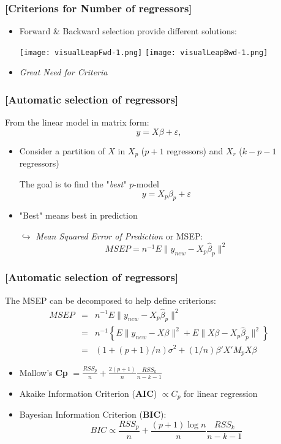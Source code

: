 \documentclass[xcolor=x11names,compress, handhouts]{beamer}
\renewcommand{\(}{\begin{columns}}
\renewcommand{\)}{\end{columns}}
\newcommand{\<}[1]{\begin{column}{#1}}
\renewcommand{\>}{\end{column}}
\begin{document}
\begin{frame} %
\frametitle{\textcolor{brique}{[Criterions for  Number of regressors]}}

\pause
\begin{itemize}[<+->]
  \item Forward \& Backward selection provide different solutions:
  \item[] \texttt{[image: visualLeapFwd-1.png]} \texttt{[image: visualLeapBwd-1.png]}
  \item \begin{center} \emph{Great Need for Criteria} \end{center}
\end{itemize}
\end{frame}


\begin{frame} %
\frametitle{\textcolor{brique}{[Automatic selection of regressors]}}
From the linear model in matrix form:
$$
 y = X \beta + \varepsilon,
$$
\pause
\begin{itemize}[<+->]
  \item Consider  a partition of $X$ in $X_p$ ($p+1$ regressors) and $X_r$ ($k-p-1$ regressors)
  \item[] The goal is to find the "\textit{best}" $p$-model
      $$
      y = X_p \beta_p + \varepsilon
      $$
  \item "Best" means  best in prediction
  \item[$\hookrightarrow$] \emph{Mean Squared Error of Prediction} or MSEP:
  $$
    MSEP = n^{-1} E \| y_{new} - X_p\widehat{\beta}_p\|^2
  $$
\end{itemize}
\end{frame}


\begin{frame} %
\frametitle{\textcolor{brique}{[Automatic selection of regressors]}}

The MSEP can be decomposed to help define criterions:
\begin{eqnarray*}
MSEP &=& n^{-1} E \| y_{new} - X_p\widehat{\beta}_p\|^2   \\
    &=& n^{-1} \left\{ E \| y_{new} - X{\beta}\|^2 + E \| X{\beta} - X_p\widehat{\beta}_p\|^2  \right\}\\
    &=& (1+(p+1)/n) \sigma^{2} + (1/n) \beta'X' M_p X\beta
\end{eqnarray*}
\pause
\begin{itemize}[<+->]
  \item Mallow's \textbf{Cp}  $ = \frac{RSS_p}{n}  + \frac{2(p+1)}{n} \frac{RSS_k}{n-k-1} $
  \item Akaike Information Criterion (\textbf{AIC})  $\propto C_p$ for linear regression
  \item Bayesian  Information Criterion (\textbf{BIC}): $$ BIC \propto \frac{RSS_p}{n}  + \frac{(p+1) \log n}{n} \frac{RSS_k}{n-k-1} $$
\end{itemize}
\end{frame}
\end{document}
